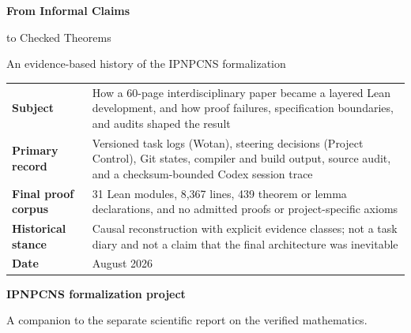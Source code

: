 \documentclass[11pt,a4paper]{article}
\begin{document}
\hypersetup{pageanchor=false}
\begin{titlepage}
  \thispagestyle{empty}

  \vspace*{13mm}
  {\color{white}\sffamily\bfseries\fontsize{29}{34}\selectfont
    From Informal Claims\par
    to Checked Theorems\par}
  \vspace{7mm}
  {\color{white}\sffamily\Large
    An evidence-based history of the IPNPCNS formalization\par}

  \vfill

  \begin{tcolorbox}[
    colback=white,
    colframe=ReportGold,
    boxrule=0.8pt,
    arc=1.5mm,
    left=4mm,right=4mm,top=3mm,bottom=3mm
  ]
  \begin{tabularx}{\linewidth}{@{}L{39mm}Y@{}}
    \textbf{Subject} &
      How a 60-page interdisciplinary paper became a layered Lean development,
      and how proof failures, specification boundaries, and audits shaped the result \\
    \textbf{Primary record} &
      Versioned task logs (Wotan), steering decisions (Project Control), Git
      states, compiler and build output, source audit, and a checksum-bounded
      Codex session trace \\
    \textbf{Final proof corpus} &
      31 Lean modules, 8,367 lines, 439 theorem or lemma declarations, and no
      admitted proofs or project-specific axioms \\
    \textbf{Historical stance} &
      Causal reconstruction with explicit evidence classes; not a task diary and
      not a claim that the final architecture was inevitable \\
    \textbf{Date} & August 2026
  \end{tabularx}
  \end{tcolorbox}

  \vspace{12mm}
  {\large\color{ReportNavy}\textbf{IPNPCNS formalization project}}\par
  \vspace{2mm}
  {\color{ReportGray}
    A companion to the separate scientific report on the verified mathematics.}
\end{titlepage}
\end{document}
